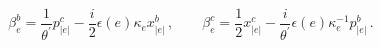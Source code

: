 \begin{equation}
\beta _{e}^{b}={\frac{1}{\theta ^{\prime }}}p_{|e|}^{c}-{\frac{i}{2}}%
\epsilon (e)\kappa _{e}x_{|e|}^{b}\,,\qquad \beta _{e}^{c}={\frac{1}{2}}%
x_{|e|}^{c}-{\frac{i}{{\theta ^{\prime }}}}\epsilon (e)\kappa
_{e}^{-1}p_{|e|}^{b}\,.\label{evenmode_fields2}
\end{equation}

